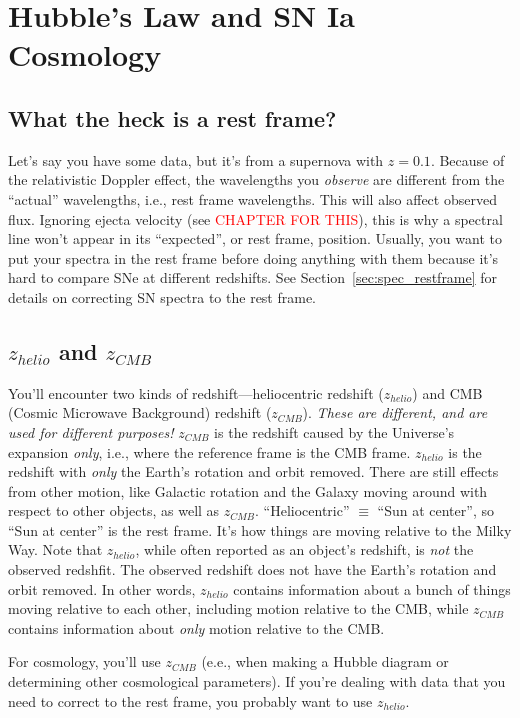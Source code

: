 \section{Hubble's Law and SN Ia Cosmology}

\subsection{What the heck is a rest frame?}

Let's say you have some data, but it's from a supernova with $z = 0.1$. Because of the relativistic Doppler effect, the wavelengths you \textit{observe} are different from the ``actual'' wavelengths, i.e., rest frame wavelengths. This will also affect observed flux. Ignoring ejecta velocity (see \textcolor{red}{CHAPTER FOR THIS}), this is why a spectral line won't appear in its ``expected'', or rest frame, position. Usually, you want to put your spectra in the rest frame before doing anything with them because it's hard to compare SNe at different redshifts. See Section~\ref{sec:spec_restframe} for details on correcting SN spectra to the rest frame. 

\subsection{$z_{helio}$ and $z_{CMB}$}

You'll encounter two kinds of redshift---heliocentric redshift ($z_{helio}$) and CMB (Cosmic Microwave Background) redshift ($z_{CMB}$). \textit{These are different, and are used for different purposes!} $z_{CMB}$ is the redshift caused by the Universe's expansion \textit{only}, i.e., where the reference frame is the CMB frame. $z_{helio}$ is the redshift with \textit{only} the Earth's rotation and orbit removed. There are still effects from other motion, like Galactic rotation and the Galaxy moving around with respect to other objects, as well as $z_{CMB}$. ``Heliocentric'' $\equiv$ ``Sun at center'', so ``Sun at center'' is the rest frame. It's how things are moving relative to the Milky Way. Note that $z_{helio}$, while often reported as an object's redshift, is \textit{not} the observed redshfit. The observed redshift does not have the Earth's rotation and orbit removed. In other words, $z_{helio}$ contains information about a bunch of things moving relative to each other, including motion relative to the CMB, while $z_{CMB}$ contains information about \textit{only} motion relative to the CMB.

For cosmology, you'll use $z_{CMB}$ (e.e., when making a Hubble diagram or determining other cosmological parameters). If you're dealing with data that you need to correct to the rest frame, you probably want to use $z_{helio}$.